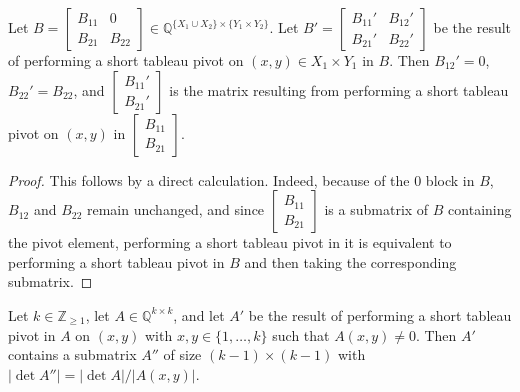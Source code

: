 \begin{lemma}\label{lem:stp_block_zero}
    Let $B = \begin{bmatrix} B_{11} & 0 \\ B_{21} & B_{22} \end{bmatrix} \in \mathbb{Q}^{\{X_{1} \cup X_{2}\} \times \{Y_{1} \times Y_{2}\}}$. Let $B' = \begin{bmatrix} B_{11}' & B_{12}' \\ B_{21}' & B_{22}' \end{bmatrix}$ be the result of performing a short tableau pivot on $(x, y) \in X_{1} \times Y_{1}$ in $B$. Then $B_{12}' = 0$, $B_{22}' = B_{22}$, and $\begin{bmatrix} B_{11}' \\ B_{21}' \end{bmatrix}$ is the matrix resulting from performing a short tableau pivot on $(x, y)$ in $\begin{bmatrix} B_{11} \\ B_{21} \end{bmatrix}$.
\end{lemma}

\begin{proof}
    This follows by a direct calculation. Indeed, because of the $0$ block in $B$, $B_{12}$ and $B_{22}$ remain unchanged, and since $\begin{bmatrix} B_{11} \\ B_{21} \end{bmatrix}$ is a submatrix of $B$ containing the pivot element, performing a short tableau pivot in it is equivalent to performing a short tableau pivot in $B$ and then taking the corresponding submatrix.
\end{proof}

\begin{lemma}\label{lem:stp_nz_abs_det_eq}
    Let $k \in \mathbb{Z}_{\geq 1}$, let $A \in \mathbb{Q}^{k \times k}$, and let $A'$ be the result of performing a short tableau pivot in $A$ on $(x, y)$ with $x, y \in \{1, \dots, k\}$ such that $A (x, y) \neq 0$. Then $A'$ contains a submatrix $A''$ of size $(k - 1) \times (k - 1)$ with $|\det A''| = |\det A| / |A (x, y)|$.
\end{lemma}

